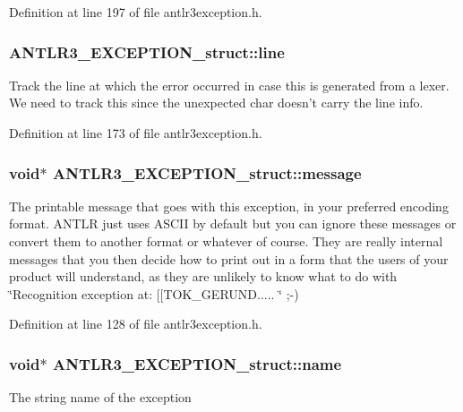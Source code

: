 Definition at line 197 of file antlr3exception.\-h.

\hypertarget{struct_a_n_t_l_r3___e_x_c_e_p_t_i_o_n__struct_ab99cca3f3aeb20df8ceadbd971f4a236}{
\subsubsection[{line}]{ A\-N\-T\-L\-R3\-\_\-\-E\-X\-C\-E\-P\-T\-I\-O\-N\-\_\-struct\-::line}}\label{struct_a_n_t_l_r3___e_x_c_e_p_t_i_o_n__struct_ab99cca3f3aeb20df8ceadbd971f4a236}
Track the line at which the error occurred in case this is generated from a lexer. We need to track this since the unexpected char doesn't carry the line info. 

Definition at line 173 of file antlr3exception.\-h.

\hypertarget{struct_a_n_t_l_r3___e_x_c_e_p_t_i_o_n__struct_adc72029eff78016a0d31355db228ade0}{
\subsubsection[{message}]{\setlength{\rightskip}{0pt plus 5cm}void$\ast$ A\-N\-T\-L\-R3\-\_\-\-E\-X\-C\-E\-P\-T\-I\-O\-N\-\_\-struct\-::message}}\label{struct_a_n_t_l_r3___e_x_c_e_p_t_i_o_n__struct_adc72029eff78016a0d31355db228ade0}
The printable message that goes with this exception, in your preferred encoding format. A\-N\-T\-L\-R just uses A\-S\-C\-I\-I by default but you can ignore these messages or convert them to another format or whatever of course. They are really internal messages that you then decide how to print out in a form that the users of your product will understand, as they are unlikely to know what to do with \char`\"{}\-Recognition exception at\-: \mbox{[}\mbox{[}\-T\-O\-K\-\_\-\-G\-E\-R\-U\-N\-D..... \char`\"{} ;-\/) 

Definition at line 128 of file antlr3exception.\-h.

\hypertarget{struct_a_n_t_l_r3___e_x_c_e_p_t_i_o_n__struct_a4ea5bbfb664b0b56817c4b0e899190f8}{
\subsubsection[{name}]{\setlength{\rightskip}{0pt plus 5cm}void$\ast$ A\-N\-T\-L\-R3\-\_\-\-E\-X\-C\-E\-P\-T\-I\-O\-N\-\_\-struct\-::name}}\label{struct_a_n_t_l_r3___e_x_c_e_p_t_i_o_n__struct_a4ea5bbfb664b0b56817c4b0e899190f8}
The string name of the exception 

